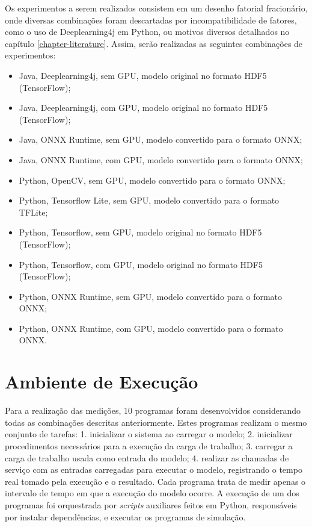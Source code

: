 Os experimentos a serem realizados consistem em um desenho fatorial fracionário, onde diversas combinações foram descartadas por incompatibilidade de fatores, como o uso de Deeplearning4j em Python, ou motivos diversos detalhados no capítulo \ref{chapter-literature}. Assim, serão realizadas as seguintes combinações de experimentos:

\begin{itemize}
  \item Java, Deeplearning4j, sem GPU, modelo original no formato HDF5 (TensorFlow);
  \item Java, Deeplearning4j, com GPU, modelo original no formato HDF5 (TensorFlow);
  \item Java, ONNX Runtime, sem GPU, modelo convertido para o formato ONNX;
  \item Java, ONNX Runtime, com GPU, modelo convertido para o formato ONNX;
  \item Python, OpenCV, sem GPU, modelo convertido para o formato ONNX;
  \item Python, Tensorflow Lite, sem GPU, modelo convertido para o formato TFLite;
  \item Python, Tensorflow, sem GPU, modelo original no formato HDF5 (TensorFlow);
  \item Python, Tensorflow, com GPU, modelo original no formato HDF5 (TensorFlow);
  \item Python, ONNX Runtime, sem GPU, modelo convertido para o formato ONNX;
  \item Python, ONNX Runtime, com GPU, modelo convertido para o formato ONNX.
\end{itemize}

\section{Ambiente de Execução}

Para a realização das medições, 10 programas foram desenvolvidos considerando todas as combinações descritas anteriormente. Estes programas realizam o mesmo conjunto de tarefas: 1. inicializar o sistema ao carregar o modelo; 2. inicializar procedimentos necessários para a execução da carga de trabalho; 3. carregar a carga de trabalho usada como entrada do modelo; 4. realizar as chamadas de serviço com as entradas carregadas para executar o modelo, registrando o tempo real tomado pela execução e o resultado. Cada programa trata de medir apenas o intervalo de tempo em que a execução do modelo ocorre. A execução de um dos programas foi orquestrada por \textit{scripts} auxiliares feitos em Python, responsáveis por instalar dependências, e executar os programas de simulação.

